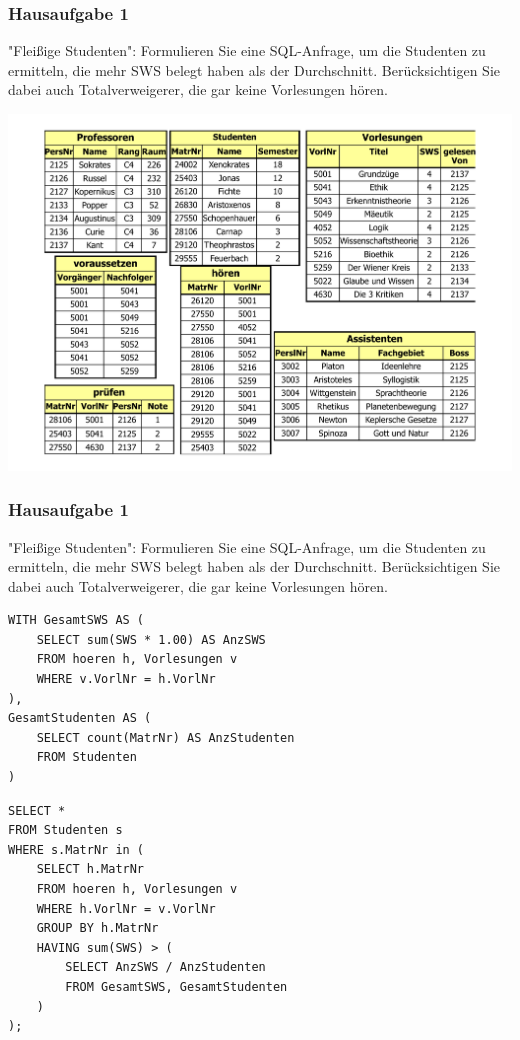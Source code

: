 \begin{frame}
	\frametitle{Hausaufgabe 1}
	\vspace{0.5cm}

	\begin{multicols}{2}
		"Fleißige Studenten": Formulieren Sie eine SQL-Anfrage, 
		um die Studenten zu ermitteln, die mehr SWS belegt haben als der Durchschnitt. 
		Berücksichtigen Sie dabei auch Totalverweigerer, die gar keine Vorlesungen hören.
		\vfill\columnbreak

		\begin{center}
			\includegraphics[height=.6\paperheight]{../img/uni.pdf}
		\end{center}
	\end{multicols}
\end{frame}

\begin{frame}[fragile]
	\frametitle{Hausaufgabe 1}
	\vspace{0.5cm}

	\begin{multicols}{2}
		"Fleißige Studenten": Formulieren Sie eine SQL-Anfrage, 
		um die Studenten zu ermitteln, die mehr SWS belegt haben als der Durchschnitt. 
		Berücksichtigen Sie dabei auch Totalverweigerer, die gar keine Vorlesungen hören.
		\begin{verbatim}
WITH GesamtSWS AS (
	SELECT sum(SWS * 1.00) AS AnzSWS
	FROM hoeren h, Vorlesungen v
	WHERE v.VorlNr = h.VorlNr
),
GesamtStudenten AS (
	SELECT count(MatrNr) AS AnzStudenten
	FROM Studenten
)
		\end{verbatim}
		\vfill\columnbreak

		\begin{verbatim}
SELECT *
FROM Studenten s
WHERE s.MatrNr in (
	SELECT h.MatrNr
	FROM hoeren h, Vorlesungen v
	WHERE h.VorlNr = v.VorlNr
	GROUP BY h.MatrNr
	HAVING sum(SWS) > (
		SELECT AnzSWS / AnzStudenten
		FROM GesamtSWS, GesamtStudenten
	)
);
		\end{verbatim}

	\end{multicols}
\end{frame}

